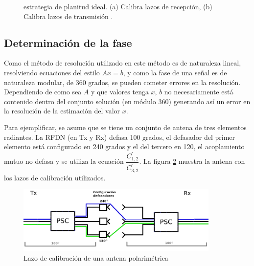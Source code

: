 \begin{figure}[H]
 \centering
	\caption{estrategia de planitud ideal. (a) Calibra lazos de recepción, (b) Calibra lazos de transmisión \cite{Aumann1989}.}
 \label{fig:ideal_strategy}
\end{figure}

\subsection{Determinación de la fase} \label{ssc:mutualPhase}

Como el método de resolución utilizado en este método es de naturaleza lineal, resolviendo ecuaciones del estilo $Ax = b$, y
como la fase de una señal es de naturaleza modular, de 360 grados, se pueden cometer errores en la resolución. Dependiendo de
como sea $A$ y que valores tenga $x$, $b$ no necesariamente está contenido dentro del conjunto solución (en módulo 360)
generando así un error en la resolución de la estimación del valor $x$.

Para ejemplificar, se asume que se tiene un conjunto de antena de tres elementos radiantes. La RFDN (en Tx y Rx) defasa 100
grados, el defasador del primer elemento está configurado en 240 grados y el del tercero en 120, el acoplamiento mutuo no defasa
y se utiliza la ecuación $\dfrac{C^{'}_{1,2}}{C^{'}_{3, 2}}$. La figura \ref{fig:phaseDetermination} muestra la antena con los 
lazos de calibración utilizados.

\begin{figure}[H]
 \centering
 \includegraphics[width=10cm]{gfx/loopCal.png}
 \caption{Lazo de calibración de una antena polarimétrica}
 \label{fig:phaseDetermination}
\end{figure}

